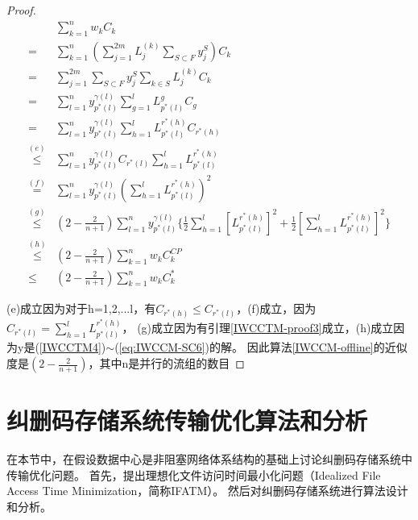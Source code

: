 \begin{proof}
\begin{align}\label{proof_optimization}
&\sum_{k=1}^{n} w_{k} C_{k}\nonumber \\
=&\sum_{k=1}^{n} (\sum_{j=1}^{2m} L_{j}^{(k)} \sum_{S\subset F} y_j^S )C_{k}\nonumber \\
=&\sum_{j=1}^{2m} \sum_{S\subset F} y_j^S\sum_{k \in S}L_{j}^{(k)}C_k \nonumber \\
=&\sum_{l=1}^{n} y_{p^*(l)}^{\gamma(l)}\sum_{g=1}^{l} L_{p^*(l)}^{g}C_g\nonumber \\
=&\sum_{l=1}^{n} y_{p^*(l)}^{\gamma(l)}\sum_{h=1}^{l} L_{p^*(l)}^{r^*(h)}C_{r^*(h)}\nonumber \\
\overset{(e)}{\leq} &\sum_{l=1}^{n} y_{p^*(l)}^{\gamma(l)}C_{r^*(l)}\sum_{h=1}^{l} L_{p^*(l)}^{r^*(h)}\nonumber \\
\overset{(f)}{=} &\sum_{l=1}^{n} y_{p^*(l)}^{\gamma(l)}(\sum_{h=1}^{l} L_{p^*(l)}^{r^*(h)})^2\nonumber \\
\overset{(g)}{\leq}& (2-\frac{2}{n+1})\sum_{l=1}^{n}y_{p^*(l)}^{\gamma(l)}\{ \frac{1}{2}\sum_{h=1}^{l} \left[L_{p^*(l)}^{r^*(h)}\right]^2+ \frac{1}{2}\left[\sum_{h=1}^{l} L_{p^*(l)}^{r^*(h)}\right]^2 \}\nonumber \\
\overset{(h)}{\leq}& (2-\frac{2}{n+1}) \sum_{k=1}^{n} w_{k} C_{k}^{CP} \nonumber \\
\leq& (2-\frac{2}{n+1}) \sum_{k=1}^{n} w_{k} C_{k}^{*} 
\end{align}

(e)成立因为对于h=1,2,...l，有$C_{r^*(h)}\leq C_{r^*(l)} $，(f)成立，因为$C_{r^*(l)}=\sum_{h=1}^{l} L_{p^*(l)}^{r^*(h)}$，
(g)成立因为有引理\ref{IWCCTM-proof3}成立，(h)成立因为y是(\ref{IWCCTM4})$\sim$(\ref{eq:IWCCM-SC6})的解。
因此算法\ref{IWCCM-offline}的近似度是$(2-\frac{2}{n+1})$，其中n是并行的流组的数目
\end{proof}

\section{纠删码存储系统传输优化算法和分析}
\label{erasure_coding:algorithm}
在本节中，在假设数据中心是非阻塞网络体系结构的基础上讨论纠删码存储系统中传输优化问题。
首先，提出理想化文件访问时间最小化问题（Idealized File Access Time Minimization，简称IFATM）。
然后对纠删码存储系统进行算法设计和分析。
